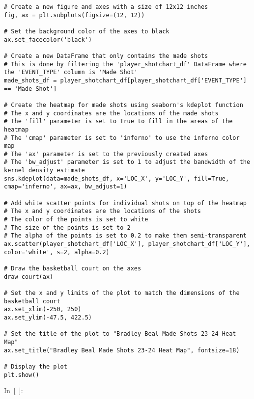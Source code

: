 \begin{verbatim}
# Create a new figure and axes with a size of 12x12 inches
fig, ax = plt.subplots(figsize=(12, 12))

# Set the background color of the axes to black
ax.set_facecolor('black')

# Create a new DataFrame that only contains the made shots
# This is done by filtering the 'player_shotchart_df' DataFrame where the 'EVENT_TYPE' column is 'Made Shot'
made_shots_df = player_shotchart_df[player_shotchart_df['EVENT_TYPE'] == 'Made Shot']

# Create the heatmap for made shots using seaborn's kdeplot function
# The x and y coordinates are the locations of the made shots
# The 'fill' parameter is set to True to fill in the areas of the heatmap
# The 'cmap' parameter is set to 'inferno' to use the inferno color map
# The 'ax' parameter is set to the previously created axes
# The 'bw_adjust' parameter is set to 1 to adjust the bandwidth of the kernel density estimate
sns.kdeplot(data=made_shots_df, x='LOC_X', y='LOC_Y', fill=True, cmap='inferno', ax=ax, bw_adjust=1)

# Add white scatter points for individual shots on top of the heatmap
# The x and y coordinates are the locations of the shots
# The color of the points is set to white
# The size of the points is set to 2
# The alpha of the points is set to 0.2 to make them semi-transparent
ax.scatter(player_shotchart_df['LOC_X'], player_shotchart_df['LOC_Y'], color='white', s=2, alpha=0.2)

# Draw the basketball court on the axes
draw_court(ax)

# Set the x and y limits of the plot to match the dimensions of the basketball court
ax.set_xlim(-250, 250)
ax.set_ylim(-47.5, 422.5)

# Set the title of the plot to "Bradley Beal Made Shots 23-24 Heat Map"
ax.set_title("Bradley Beal Made Shots 23-24 Heat Map", fontsize=18)

# Display the plot
plt.show()
\end{verbatim}

In~{[}~{]}:

